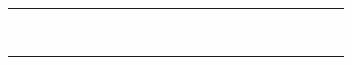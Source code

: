 \documentclass[12pt,a5paper]{book}
\begin{document}
\begin{table}[h!]
\begin{tabular}{c ccccccccccccccccccccccc}
    & & & & & & & & & & & & & & & & & & & & & & &  \\
    \cline{1-2} \cline{4-23}
    \vspace{5pt}
    & & & & & & & & & & & & & & & & & & & & & & &  \\
    \cline{1-2} \cline{4-23}
    \vspace{5pt}
    & & & & & & & & & & & & & & & & & & & & & & &  \\
    \cline{1-2} \cline{4-23}
    \vspace{5pt}
    & & & & & & & & & & & & & & & & & & & & & & &  \\
    \cline{1-2} \cline{4-23}
    \vspace{5pt} 
    & & & & & & & & & & & & & & & & & & & & & & &  \\
    \cline{1-2} \cline{4-23}
    \vspace{5pt}
    & & & & & & & & & & & & & & & & & & & & & & &  \\
    \cline{1-2} \cline{4-23}
    \vspace{5pt}
    & & & & & & & & & & & & & & & & & & & & & & &  \\
    \cline{1-2} \cline{4-23}
    \vspace{5pt}
    & & & & & & & & & & & & & & & & & & & & & & &  \\
    \cline{1-2} \cline{4-23}
    \vspace{5pt}
   
\end{tabular}

\end{table}
\end{document}
